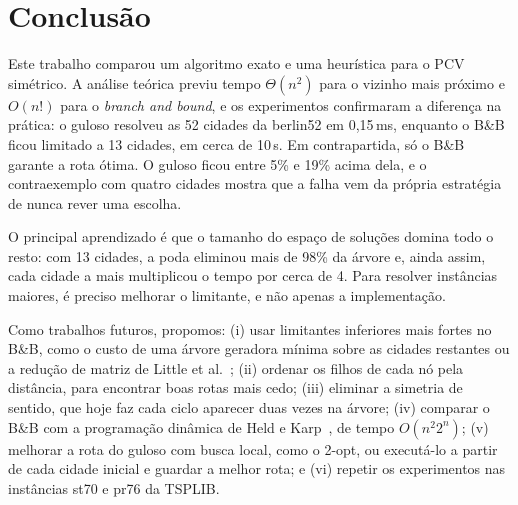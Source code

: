 \documentclass[12pt,a4paper]{article}
\begin{document}
\section{Conclusão}\label{sec:conclusao}

Este trabalho comparou um algoritmo exato e uma heurística para o PCV simétrico. A análise teórica previu tempo $\Theta(n^2)$ para o vizinho mais próximo e $O(n!)$ para o \emph{branch and bound}, e os experimentos confirmaram a diferença na prática: o guloso resolveu as 52 cidades da berlin52 em 0,15\,ms, enquanto o B\&B ficou limitado a 13 cidades, em cerca de 10\,s. Em contrapartida, só o B\&B garante a rota ótima. O guloso ficou entre 5\% e 19\% acima dela, e o contraexemplo com quatro cidades mostra que a falha vem da própria estratégia de nunca rever uma escolha.

O principal aprendizado é que o tamanho do espaço de soluções domina todo o resto: com 13 cidades, a poda eliminou mais de 98\% da árvore e, ainda assim, cada cidade a mais multiplicou o tempo por cerca de 4. Para resolver instâncias maiores, é preciso melhorar o limitante, e não apenas a implementação.

Como trabalhos futuros, propomos: (i) usar limitantes inferiores mais fortes no B\&B, como o custo de uma árvore geradora mínima sobre as cidades restantes ou a redução de matriz de Little et al.~\cite{little1963}; (ii) ordenar os filhos de cada nó pela distância, para encontrar boas rotas mais cedo; (iii) eliminar a simetria de sentido, que hoje faz cada ciclo aparecer duas vezes na árvore; (iv) comparar o B\&B com a programação dinâmica de Held e Karp~\cite{heldkarp1962}, de tempo $O(n^2 2^n)$; (v) melhorar a rota do guloso com busca local, como o 2-opt, ou executá-lo a partir de cada cidade inicial e guardar a melhor rota; e (vi) repetir os experimentos nas instâncias st70 e pr76 da TSPLIB.
\end{document}

